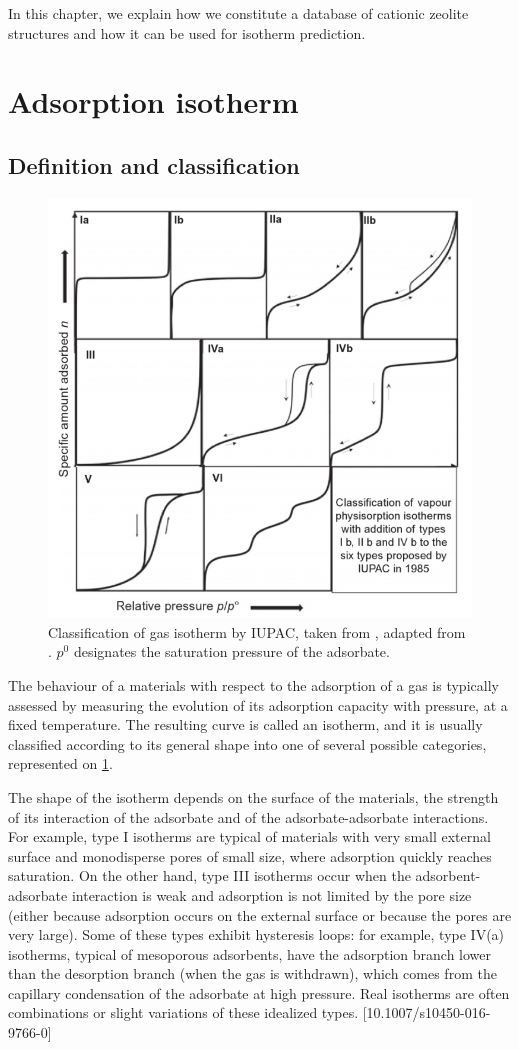 \documentclass[main.tex]{subfiles}
\begin{document}
In this chapter, we explain how we constitute a database of cationic zeolite structures and how it can be used for isotherm prediction.

\section{Adsorption isotherm}

\subsection{Definition and classification}

\begin{figure}[b]
	\centering
	\includegraphics[width=0.6\columnwidth]{figures/database/IsothermTypes.png}
	\caption{Classification of gas isotherm by IUPAC, taken from \cite{Rouquerol2013}, adapted from \cite{IUPAC1985}. $p^0$ designates the saturation pressure of the adsorbate.}\label{fig:IUPACisotherms}
\end{figure}

The behaviour of a materials with respect to the adsorption of a gas is typically assessed by measuring the evolution of its adsorption capacity with pressure, at a fixed temperature. The resulting curve is called an isotherm, and it is usually classified according to its general shape into one of several possible categories, represented on \cref{fig:IUPACisotherms}.

The shape of the isotherm depends on the surface of the materials, the strength of its interaction of the adsorbate and of the adsorbate-adsorbate interactions. For example, type I isotherms are typical of materials with very small external surface and monodisperse pores of small size, where adsorption quickly reaches saturation. On the other hand, type III isotherms occur when the adsorbent-adsorbate interaction is weak and adsorption is not limited by the pore size (either because adsorption occurs on the external surface or because the pores are very large). Some of these types exhibit hysteresis loops: for example, type IV(a) isotherms, typical of mesoporous adsorbents, have the adsorption branch lower than the desorption branch (when the gas is withdrawn), which comes from the capillary condensation of the adsorbate at high pressure. Real isotherms are often combinations or slight variations of these idealized types. [10.1007/s10450-016-9766-0]
\end{document}
